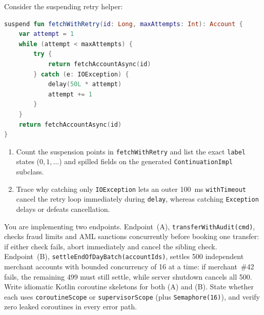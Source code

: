 \begin{exercise}
\label{ex:ch10-hand-compile-cps}
Consider the suspending retry helper:
\begin{lstlisting}[language=Kotlin]
suspend fun fetchWithRetry(id: Long, maxAttempts: Int): Account {
    var attempt = 1
    while (attempt < maxAttempts) {
        try {
            return fetchAccountAsync(id)
        } catch (e: IOException) {
            delay(50L * attempt)
            attempt += 1
        }
    }
    return fetchAccountAsync(id)
}
\end{lstlisting}
\begin{enumerate}
  \item Count the suspension points in \texttt{fetchWithRetry} and list the exact \texttt{label} states ($0, 1, \dots$) and spilled fields on the generated \texttt{ContinuationImpl} subclass.
  \item Trace why catching only \texttt{IOException} lets an outer 100~ms \texttt{withTimeout} cancel the retry loop immediately during \texttt{delay}, whereas catching \texttt{Exception} delays or defeats cancellation.
\end{enumerate}
\end{exercise}

\begin{exercise}
\label{ex:ch10-structured-concurrency}
You are implementing two endpoints. Endpoint~(A), \texttt{transferWithAudit(cmd)}, checks fraud limits and AML sanctions concurrently before booking one transfer: if either check fails, abort immediately and cancel the sibling check. Endpoint~(B), \texttt{settleEndOfDayBatch(accountIds)}, settles 500 independent merchant accounts with bounded concurrency of 16 at a time: if merchant~\#42 fails, the remaining 499 must still settle, while server shutdown cancels all 500.
Write idiomatic Kotlin coroutine skeletons for both (A) and (B). State whether each uses \texttt{coroutineScope} or \texttt{supervisorScope} (plus \texttt{Semaphore(16)}), and verify zero leaked coroutines in every error path.
\end{exercise}
